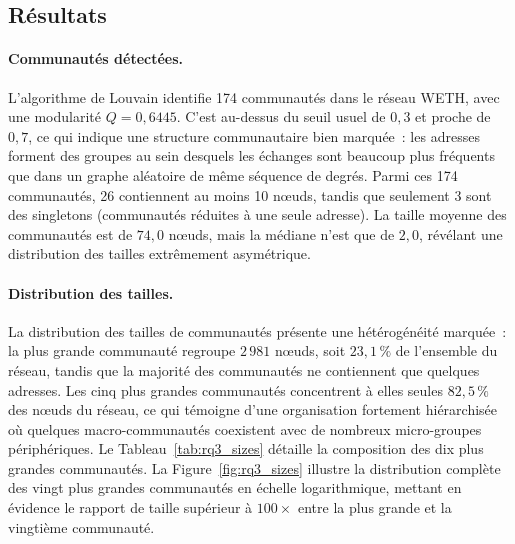 \subsection{R\'esultats}
\label{sec:rq3_resultats}

\paragraph{Communaut\'es d\'etect\'ees.}
L'algorithme de Louvain identifie 174 communaut\'es dans le r\'eseau WETH, avec une modularit\'e $Q = 0{,}6445$. C'est au-dessus du seuil usuel de $0{,}3$ et proche de $0{,}7$, ce qui indique une structure communautaire bien marqu\'ee~: les adresses forment des groupes au sein desquels les \'echanges sont beaucoup plus fr\'equents que dans un graphe al\'eatoire de m\^eme s\'equence de degr\'es. Parmi ces 174 communaut\'es, 26 contiennent au moins 10 n\oe{}uds, tandis que seulement 3 sont des singletons (communaut\'es r\'eduites \`a une seule adresse). La taille moyenne des communaut\'es est de $74{,}0$ n\oe{}uds, mais la m\'ediane n'est que de $2{,}0$, r\'ev\'elant une distribution des tailles extr\^emement asym\'etrique.

\paragraph{Distribution des tailles.}
La distribution des tailles de communaut\'es pr\'esente une h\'et\'erog\'en\'eit\'e marqu\'ee~: la plus grande communaut\'e regroupe $2\,981$ n\oe{}uds, soit $23{,}1\,\%$ de l'ensemble du r\'eseau, tandis que la majorit\'e des communaut\'es ne contiennent que quelques adresses. Les cinq plus grandes communaut\'es concentrent \`a elles seules $82{,}5\,\%$ des n\oe{}uds du r\'eseau, ce qui t\'emoigne d'une organisation fortement hi\'erarchis\'ee o\`u quelques macro-communaut\'es coexistent avec de nombreux micro-groupes p\'eriph\'eriques. Le Tableau~\ref{tab:rq3_sizes} d\'etaille la composition des dix plus grandes communaut\'es. La Figure~\ref{fig:rq3_sizes} illustre la distribution compl\`ete des vingt plus grandes communaut\'es en \'echelle logarithmique, mettant en \'evidence le rapport de taille sup\'erieur \`a $100\times$ entre la plus grande et la vingti\`eme communaut\'e.

